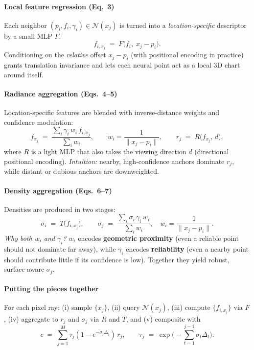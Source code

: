 \begin{enrichment}
\begin{enrichment}
\begin{enrichment}
        \paragraph{Local feature regression (Eq.~3)}
        Each neighbor $(p_i,f_i,\gamma_i)\in\mathcal{N}(x_j)$ is turned into a \emph{location-specific} descriptor by a small MLP $F$:
        \[
        f_{i,x_j}\;=\;F\!\big(f_i,\;x_j-p_i\big).
        \]
        Conditioning on the \emph{relative} offset $x_j-p_i$ (with positional encoding in practice) grants translation invariance and lets each neural point act as a local 3D chart around itself.
        
        \paragraph{Radiance aggregation (Eqs.~4–5)}
        Location-specific features are blended with inverse-distance weights and confidence modulation:
        \[
        f_{x_j}\;=\;\frac{\sum_{i}\gamma_i\,w_i\,f_{i,x_j}}{\sum_i w_i},
        \qquad
        w_i=\frac{1}{\|x_j-p_i\|},
        \qquad
        r_j\;=\;R\!\big(f_{x_j},\,d\big),
        \]
        where $R$ is a light MLP that also takes the viewing direction $d$ (directional positional encoding). \emph{Intuition:} nearby, high-confidence anchors dominate $r_j$, while distant or dubious anchors are downweighted.
        
        \paragraph{Density aggregation (Eqs.~6–7)}
        Densities are produced in two stages:
        \[
        \sigma_i \;=\; T\!\big(f_{i,x_j}\big),\qquad
        \sigma_j\;=\;\frac{\sum_i \sigma_i\,\gamma_i\,w_i}{\sum_i w_i},
        \quad
        w_i=\frac{1}{\|x_j-p_i\|}.
        \]
        \emph{Why both $w_i$ and $\gamma_i$?} $w_i$ encodes \textbf{geometric proximity} (even a reliable point should not dominate far away), while $\gamma_i$ encodes \textbf{reliability} (even a nearby point should contribute little if its confidence is low). Together they yield robust, surface-aware $\sigma_j$.
        
        \paragraph{Putting the pieces together}
        For each pixel ray: (i) sample $\{x_j\}$, (ii) query $\mathcal{N}(x_j)$, (iii) compute $\{f_{i,x_j}\}$ via $F$, (iv) aggregate to $r_j$ and $\sigma_j$ via $R$ and $T$, and (v) composite with
        \[
        c \;=\; \sum_{j=1}^{M}\tau_j\!\left(1-e^{-\sigma_j\Delta_j}\right)\, r_j,
        \qquad
        \tau_j \;=\; \exp\!\Big(-\sum_{t=1}^{j-1}\sigma_t\Delta_t\Big).
        \]
        

\end{enrichment}
\end{enrichment}
\end{enrichment}
